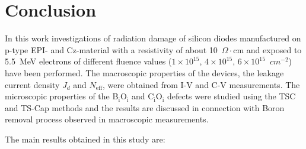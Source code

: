 \documentclass[final, 5p, times]{elsarticle}
\begin{document}
\section{Conclusion}
In this work investigations of radiation damage of silicon diodes manufactured on p-type EPI- and Cz-material with a resistivity of about 10~$\Omega\cdot$cm and exposed to \SI{5.5}{\mega\electronvolt} electrons of different fluence values ($1 \times 10^{15}$, $4 \times 10^{15}$, $6 \times 10^{15}$~$\si{cm^{-2}}$) have been performed. The macroscopic properties of the devices, the leakage current density $J_d$ and $N_\text{eff}$, were obtained from I-V and C-V measurements. The microscopic properties of the B$_\text{i}$O$_\text{i}$ and C$_\text{i}$O$_\text{i}$ defects were studied using the TSC and TS-Cap methods and the results are discussed in connection with Boron removal process observed in macroscopic measurements.
\par
The main results obtained in this study are:
\end{document}
